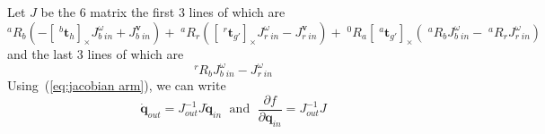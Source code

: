 \documentclass{article}
\newcommand\linvel{\mathbf{v}}
\newcommand\trans{\mathbf{t}}
\newcommand\conf{\mathbf{q}}
\begin{document}
Let $J$ be the 6 matrix the first 3 lines of which are
$$
^aR_b(-[\;^b\trans_h]_{\times}J_{b\;in}^{\omega} + J_{b\;in}^{\linvel})
+\;^aR_r([\;^r\trans_{g'}]_{\times}J_{r\;in}^{\omega} - J_{r\;in}^{\linvel}) + \;^0R_a[\;^a\trans_{g'}]_{\times} (\;^aR_bJ_{b\;in}^{\omega} - \;^aR_{r}J_{r\;in}^{\omega})
$$
and the last 3 lines of which are
$$
^rR_bJ_{b\;in}^{\omega} - J_{r\;in}^{\omega}
$$
Using~(\ref{eq:jacobian arm}), we can write
$$
\dot{\conf}_{out} = J_{out}^{-1}J \dot{\conf}_{in} \;\mbox{ and }\; \frac{\partial f}{\partial \conf_{in}} = J_{out}^{-1}J
$$


\end{document}

